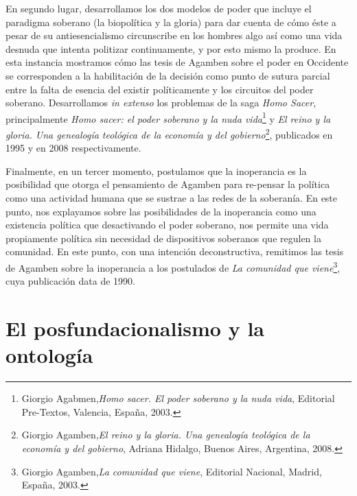 \documentclass{book}
\begin{document}
En segundo lugar, desarrollamos los dos modelos de poder que incluye el
paradigma soberano (la biopolítica y la gloria) para dar cuenta de cómo
éste a pesar de su antiesencialismo circunscribe en los hombres algo así
como una vida desnuda que intenta politizar continuamente, y por esto
mismo la produce. En esta instancia mostramos cómo las tesis de Agamben
sobre el poder en Occidente se corresponden a la habilitación de la
decisión como punto de sutura parcial entre la falta de esencia del
existir políticamente y los circuitos del poder soberano. Desarrollamos
\emph{in extenso} los problemas de la saga \emph{Homo Sacer},
principalmente \emph{Homo sacer: el poder soberano y la nuda
vida}\footnote{Giorgio Agabmen,\emph{Homo sacer. El poder soberano y la
  nuda vida}, Editorial Pre-Textos, Valencia, España, 2003.} y \emph{El
reino y la gloria. Una genealogía teológica de la economía y del
gobierno}\footnote{Giorgio Agamben,\emph{El reino y la gloria. Una
  genealogía teológica de la economía y del gobierno}, Adriana Hidalgo,
  Buenos Aires, Argentina, 2008.}, publicados en 1995 y en 2008
respectivamente.

Finalmente, en un tercer momento, postulamos que la inoperancia es la
posibilidad que otorga el pensamiento de Agamben para re-pensar la
política como una actividad humana que se sustrae a las redes de la
soberanía. En este punto, nos explayamos sobre las posibilidades de la
inoperancia como una existencia política que desactivando el poder
soberano, nos permite una vida propiamente política sin necesidad de
dispositivos soberanos que regulen la comunidad. En este punto, con una
intención deconstructiva, remitimos las tesis de Agamben sobre la
inoperancia a los postulados de \emph{La comunidad que
viene}\footnote{Giorgio Agamben,\emph{La comunidad que viene}, Editorial
  Nacional, Madrid, España, 2003.}, cuya publicación data de 1990.

\section{El posfundacionalismo y la ontología}
\end{document}
